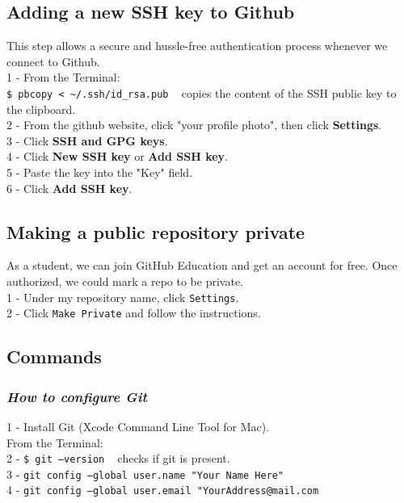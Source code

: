 \documentclass{article}
\begin{document}
{{{\subsection{Adding a new SSH key to Github}
This step allows a secure and hussle-free authentication process whenever we connect to Github. \\
1 - From the Terminal:\\
\texttt{\$ pbcopy < \textasciitilde /.ssh/id\_rsa.pub} ~ copies the content of the SSH public key to the clipboard. \\
2 - From the github website, click "your profile photo", then click \textbf{Settings}.\\
3 - Click \textbf{SSH and GPG keys}.\\
4 - Click \textbf{New SSH key} or \textbf{Add SSH key}.\\
5 - Paste the key into the "Key" field.\\
6 - Click \textbf{Add SSH key}.\\

\subsection{Making a public repository private}
As a student, we can join GitHub Education and get an account for free. Once authorized, we could mark a repo to be private.\\
1 - Under my repository name, click \texttt{Settings}. \\
2 - Click \texttt{Make Private} and follow the instructions.\\

\subsection{Commands}
\subsubsection{\small\textsl{How to configure Git}}

1 - Install Git (Xcode Command Line Tool for Mac). \\
From the Terminal:\\
2 - \texttt{\$ git --version} ~ checks if git is present.\\
3 - \texttt{git config --global user.name "Your Name Here"} \\
4 - \texttt{git config --global user.email "YourAddress@mail.com}\\

}}}
\end{document}
